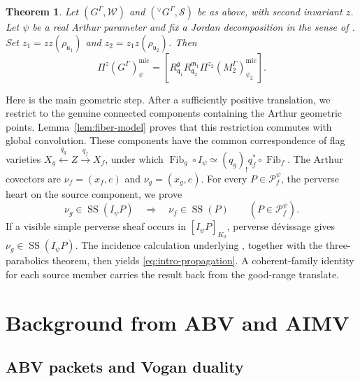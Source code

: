 \documentclass[10pt]{amsart}
\numberwithin{equation}{section}
\theoremstyle{plain}
\newtheorem{theorem}[proposition]{Theorem}
\theoremstyle{definition}
\theoremstyle{remark}
\newcommand{\fg}{\mathfrak g}
\newcommand{\fm}{\mathfrak m}
\newcommand{\fq}{\mathfrak q}
\newcommand{\fu}{\mathfrak u}
\newcommand{\vG}{{}^{\vee}G}
\newcommand{\mic}{\mathrm{mic}}
\newcommand{\SSupp}{\operatorname{SS}}
\begin{document}
\begin{theorem}\label{thm:main}
Let $(G^\Gamma,\mathcal W)$ and $(\vG^\Gamma,\mathcal S)$ be as above,
with second invariant $z$. Let $\psi$ be a real Arthur parameter and fix
a Jordan decomposition in the sense of
\cite[Definition~4.1.1]{AIMV26}. Set
$z_1=zz(\rho_{\fu_1})$ and $z_2=z_1z(\rho_{\fu_2})$. Then
\begin{equation}\label{eq:main}
  \Pi^z(G^\Gamma)^{\mic}_{\psi}
  =
  \left[
  R_{\fq_1}^{\fg}R_{\fq_2}^{\fm_1}
  \Pi^{z_2}(M_2^\Gamma)^{\mic}_{\psi_2}
  \right].
\end{equation}
\end{theorem}

Here is the main geometric step. After a sufficiently positive translation,
we restrict to the genuine connected components containing the Arthur
geometric points. Lemma~\ref{lem:fiber-model} proves that this restriction
commutes with global convolution. These components have the common
correspondence of flag varieties
$X_g\xleftarrow{q_g}Z\xrightarrow{q_f}X_f$, under which
$\operatorname{Fib}_g\circ I_\psi\simeq
(q_g)_!q_f^*\circ\operatorname{Fib}_f$. The Arthur covectors are
$\nu_f=(x_f,e)$ and $\nu_g=(x_g,e)$. For every
$P\in\mathcal P_f^\psi$, the perverse heart on the source component,
we prove
\begin{equation}\label{eq:intro-propagation}
  \nu_g\in\SSupp(I_\psi P)
  \quad\Longrightarrow\quad
  \nu_f\in\SSupp(P)
  \qquad(P\in\mathcal P_f^\psi).
\end{equation}
If a visible simple perverse sheaf occurs in $[I_\psi P]_{K_0}$, perverse
d\'evissage gives $\nu_g\in\SSupp(I_\psi P)$. The incidence calculation underlying
\cite[Lemma~4.6.2]{AIMV26}, together with the three-parabolics theorem,
then yields \eqref{eq:intro-propagation}. A coherent-family identity for each
source member carries the result back from the good-range translate.

\section{Background from ABV and AIMV}

\subsection{ABV packets and Vogan duality}
\end{document}
